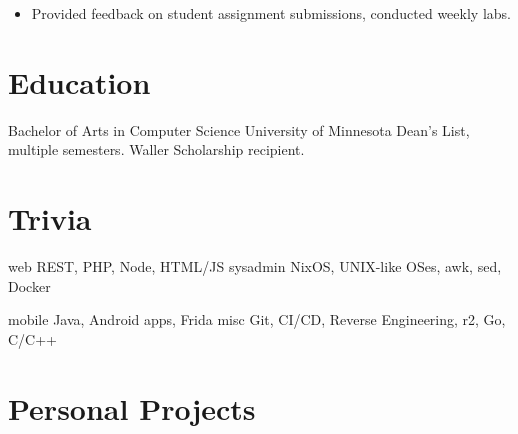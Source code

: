 \documentclass{moderncv}
\newcommand{\comment}[1]{}
\begin{document}
{
  \begin{itemize}[label=\rightarrow,noitemsep]
  \item Provided feedback on student assignment submissions, conducted weekly labs.
  \end{itemize}
}

\comment{
\cventry{2019--2020}{Member, Controls Team}{UMN Solar Vehicle Project}{}{}
{
  \begin{itemize}[label=\rightarrow,noitemsep]
  \item Worked on design of the rearview system and integrated USB tethered logging for the telemetry system.
  \item Prototyped an editor for a YAML-based CAN packet definition schema in Rust.
  \item Participated extensively in build cycle (layups) for the Freya vehicle, which won 1st place at the Formula Sun Grand Prix.
  \end{itemize}
}}

\section{Education}
{Bachelor of Arts in Computer Science}
{University of Minnesota}
{}{}
{
  Dean's List, multiple semesters. Waller Scholarship recipient.
}


\section{Trivia}

\cvdoubleitem
{web}
{
  REST, PHP, Node, HTML/JS
}
{sysadmin}
{
  NixOS, UNIX-like OSes, awk, sed, Docker
}

\cvdoubleitem
{mobile}
{
  Java, Android apps, Frida
}
{misc}
{
  Git, CI/CD, Reverse Engineering, r2, Go, C/C++
}

\section{Personal Projects}
\end{document}
